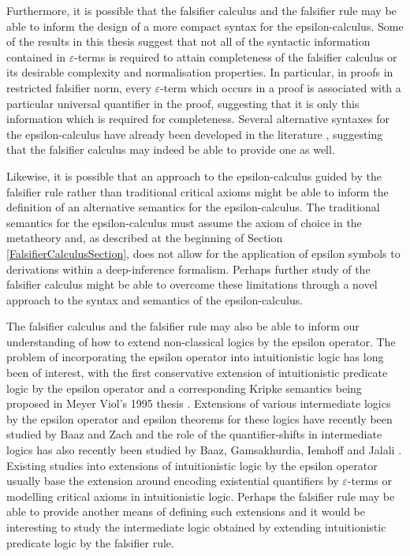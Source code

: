 \documentclass[10pt]{article}
\theoremstyle{definition}\newtheorem{remark}[theorem]{Remark}
\theoremstyle{definition}\newtheorem{example}[theorem]{Example}
\theoremstyle{definition}\newtheorem{definition}[theorem]{Definition}
\begin{document}
	Furthermore, it is possible that the falsifier calculus and the falsifier rule may be able to inform the design of a more compact syntax for the epsilon-calculus. Some of the results in this thesis suggest that not all of the syntactic information contained in $\varepsilon$-terms is required to attain completeness of the falsifier calculus or its desirable complexity and normalisation properties. In particular, in proofs in restricted falsifier norm, every $\varepsilon$-term which occurs in a proof is associated with a particular universal quantifier in the proof, suggesting that it is only this information which is required for completeness. Several alternative syntaxes for the epsilon-calculus have already been developed in the literature \cite{DavisFectherFreeVariable, FechterThesis, BaazEpsilon}, suggesting that the falsifier calculus may indeed be able to provide one as well.
	
	Likewise, it is possible that an approach to the epsilon-calculus guided by the falsifier rule rather than traditional critical axioms might be able to inform the definition of an alternative semantics for the epsilon-calculus. The traditional semantics for the epsilon-calculus must assume the axiom of choice in the metatheory and, as described at the beginning of Section \ref{FalsifierCalculusSection}, does not allow for the application of epsilon symbols to derivations within a deep-inference formalism. Perhaps further study of the falsifier calculus might be able to overcome these limitations through a novel approach to the syntax and semantics of the epsilon-calculus.
	
	The falsifier calculus and the falsifier rule may also be able to inform our understanding of how to extend non-classical logics by the epsilon operator. The problem of incorporating the epsilon operator into intuitionistic logic has long been of interest, with the first conservative extension of intuitionistic predicate logic by the epsilon operator and a corresponding Kripke semantics being proposed in Meyer Viol's 1995 thesis \cite{MeyerViolThesis}. Extensions of various intermediate logics by the epsilon operator and epsilon theorems for these logics have recently been studied by Baaz and Zach \cite{BaazZachIntermediateEpsilons} and the role of the quantifier-shifts in intermediate logics has also recently been studied by Baaz, Gamsakhurdia, Iemhoff and Jalali \cite{BaazSkolemisationIntermediateLogics}. Existing studies into extensions of intuitionistic logic by the epsilon operator usually base the extension around encoding existential quantifiers by $\varepsilon$-terms or modelling critical axioms in intuitionistic logic. Perhaps the falsifier rule may be able to provide another means of defining such extensions and it would be interesting to study the intermediate logic obtained by extending intuitionistic predicate logic by the falsifier rule.
	
\end{document}
